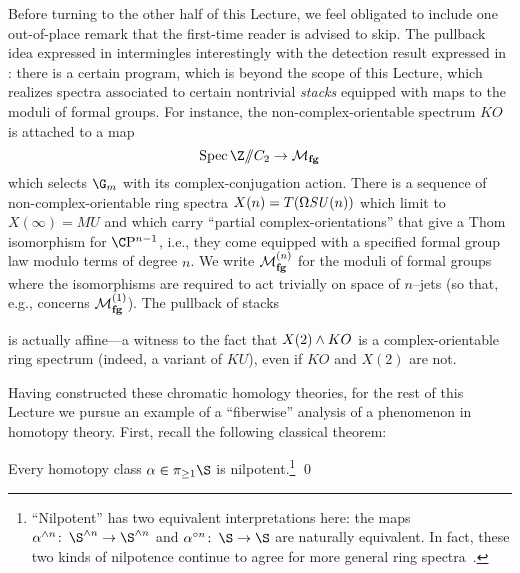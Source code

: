 \begin{remark}\label{RemovingStackinessFromSpectra}
Before turning to the other half of this Lecture, we feel obligated to include one out-of-place remark that the first-time reader is advised to skip.  The pullback idea expressed in  intermingles interestingly with the detection result expressed in : there is a certain program, which is beyond the scope of this Lecture, which realizes spectra associated to certain nontrivial \emph{stacks} equipped with maps to the moduli of formal groups.  For instance, the non-complex-orientable spectrum \(KO\) is attached to a map \[\Spec \Z \mmod C_2 \to \moduli{fg}\] which selects \(\G_m\) with its complex-conjugation action.  There is a sequence of non-complex-orientable ring spectra \(X(n) = T(\Omega \mathit{SU}(n))\) which limit to \(X(\infty) = MU\) and which carry ``partial complex-orientations'' that give a Thom isomorphism for \(\CP^{n-1}\), i.e., they come equipped with a specified formal group law modulo terms of degree \(n\).  We write \(\mathcal{M}_{\mathbf{fg}}^{(n)}\) for the moduli of formal groups where the isomorphisms are required to act trivially on space of \(n\)--jets (so that, e.g.,  concerns \(\mathcal{M}_{\mathbf{fg}}^{(1)}\)).  The pullback of stacks
\begin{center}
\end{center}
is actually affine---a witness to the fact that \(X(2) \wedge KO\) is a complex-orientable ring spectrum (indeed, a variant of \(KU\)), even if \(KO\) and \(X(2)\) are not.
\end{remark}

Having constructed these chromatic homology theories, for the rest of this Lecture we pursue an example of a ``fiberwise'' analysis of a phenomenon in homotopy theory.  First, recall the following classical theorem:

\begin{theorem}
Every homotopy class \(\alpha \in \pi_{\ge 1} \S\) is nilpotent.\footnote{``Nilpotent'' has two equivalent interpretations here: the maps \(\alpha^{\sm n}\co \S^{\sm n} \to \S^{\sm n}\) and \(\alpha^{\circ n}\co \S \to \S\) are naturally equivalent.  In fact, these two kinds of nilpotence continue to agree for more general ring spectra~\cite[Introduction]{DHS}.} \qed
\end{theorem}

